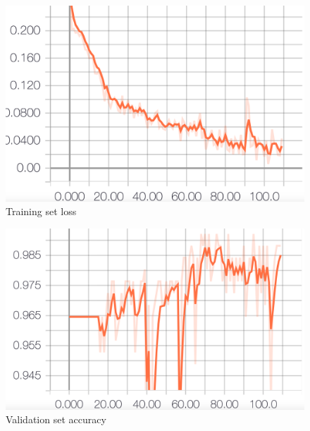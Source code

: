 \documentclass[8pt,notitlepage]{report}
\begin{document}
			\begin{figure}[H]
				\begin{center}
					\includegraphics[scale=.16]{loss_Manuel}
					\caption{Training set loss}
				\end{center}
			\end{figure}
		
			\newpage
			
			\begin{figure}[H]
				\begin{center}
					\includegraphics[scale=.16]{val_acc_Manuel}
					\caption{Validation set accuracy}
					\label{fig:acc_val_Manuel}
				\end{center}
			\end{figure}
			
\end{document}
